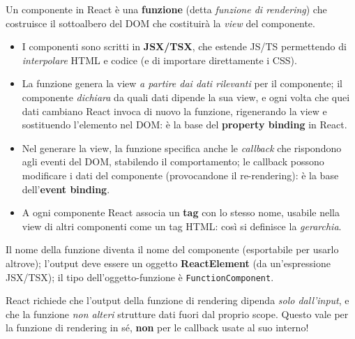 \begin{definizione}
Un componente in React \`e una \textbf{funzione} (detta \emph{funzione di rendering}) che
costruisce il sottoalbero del DOM che costituir\`a la \emph{view} del componente.
\begin{itemize}
  \item I componenti sono scritti in \textbf{JSX/TSX}, che estende JS/TS permettendo di
        \emph{interpolare} HTML e codice (e di importare direttamente i CSS).
  \item La funzione genera la view \emph{a partire dai dati rilevanti} per il componente;
        il componente \emph{dichiara} da quali dati dipende la sua view, e ogni volta che
        quei dati cambiano React invoca di nuovo la funzione, rigenerando la view e
        sostituendo l'elemento nel DOM: \`e la base del \textbf{property binding} in React.
  \item Nel generare la view, la funzione specifica anche le \emph{callback} che rispondono
        agli eventi del DOM, stabilendo il comportamento; le callback possono modificare i
        dati del componente (provocandone il re-rendering): \`e la base
        dell'\textbf{event binding}.
  \item A ogni componente React associa un \textbf{tag} con lo stesso nome, usabile nella
        view di altri componenti come un tag HTML: cos\`i si definisce la \emph{gerarchia}.
\end{itemize}
\end{definizione}

Il nome della funzione diventa il nome del componente (esportabile per usarlo altrove);
l'output deve essere un oggetto \textbf{ReactElement} (da un'espressione JSX/TSX); il tipo
dell'oggetto-funzione \`e \texttt{FunctionComponent}.
\begin{attenzione}
React richiede che l'output della funzione di rendering dipenda \emph{solo dall'input}, e che
la funzione \emph{non alteri} strutture dati fuori dal proprio scope. Questo vale per la
funzione di rendering in s\'e, \textbf{non} per le callback usate al suo interno!
\end{attenzione}

